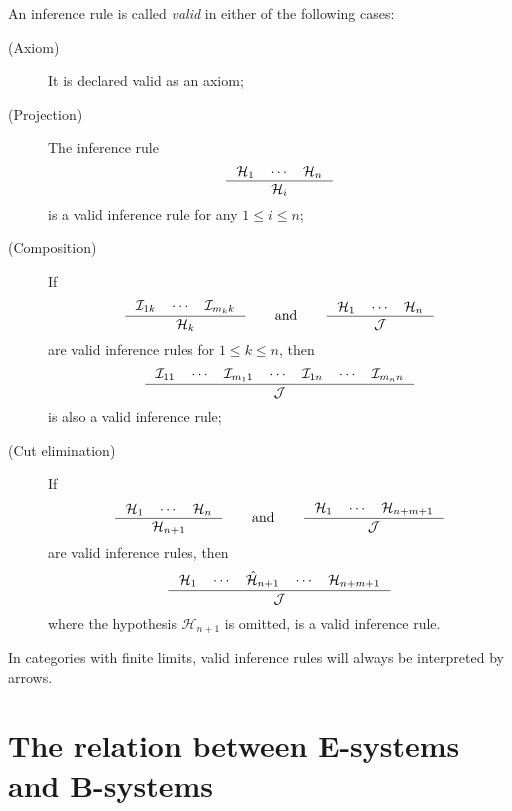 \documentclass{article}
\begin{document}
An inference rule is called \emph{valid} in either of the following cases:
\begin{description}
\item[(Axiom)] It is declared valid as an axiom;
\item[(Projection)] The inference rule
\begin{equation*}
\inference{\mathcal{H}_1\quad\cdots\quad\mathcal{H}_n}{\mathcal{H}_i}
\end{equation*}
is a valid inference rule for any $1\leq i\leq n$;
\item[(Composition)] If
\begin{equation*}
\inference{\mathcal{I}_{1k}\quad\cdots\quad\mathcal{I}_{m_kk}}{\mathcal{H}_k}
\qquad\text{and}\qquad
\inference{\mathcal{H}_1\quad\cdots\quad\mathcal{H}_n}{\mathcal{J}}
\end{equation*}
are valid inference rules for $1\leq k\leq n$, then
\begin{equation*}
\inference{\mathcal{I}_{11}\quad\cdots\quad\mathcal{I}_{m_11}\quad\cdots\quad\mathcal{I}_{1n}\quad\cdots\quad\mathcal{I}_{m_nn}}{\mathcal{J}}
\end{equation*}
is also a valid inference rule;
\item[(Cut elimination)] If
\begin{equation*}
\inference{\mathcal{H}_1\quad\cdots\quad\mathcal{H}_n}{\mathcal{H}_{n+1}}
\qquad
\text{and}
\qquad
\inference{\mathcal{H}_1\quad\cdots\quad\mathcal{H}_{n+m+1}}{\mathcal{J}}
\end{equation*}
are valid inference rules, then
\begin{equation*}
\inference{\mathcal{H}_1\quad\cdots\quad\hat{\mathcal{H}}_{n+1}\quad\cdots\quad\mathcal{H}_{n+m+1}}{\mathcal{J}}
\end{equation*}
where the hypothesis $\mathcal{H}_{n+1}$ is omitted, is a valid inference rule.
\end{description}
In categories with finite limits, valid inference rules will always be 
interpreted by  arrows.















\section{The relation between E-systems and B-systems}
\end{document}
